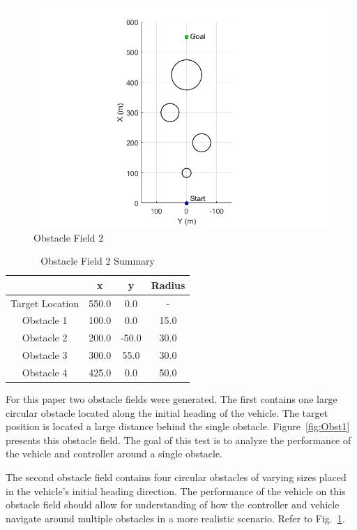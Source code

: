 \documentclass[12pt,twocolumn]{article}
\begin{document}
\begin{figure}
	\centering
	\includegraphics[width=\columnwidth]{Figs/ObstacleField2.png}
	\caption{\small Obstacle Field 2}   
	\label{fig:Obst2}
\end{figure}

\begin{table}
\begin{center}
	\begin{tabular}{||c|c|c|c||} 
		\hline
		& x & y & Radius\\
		\hline
		Target Location  & 550.0 & 0.0 & -\\ 
		\hline
		Obstacle 1 & 100.0 & 0.0 & 15.0\\
		\hline
		Obstacle 2 & 200.0 & -50.0 & 30.0\\
		\hline
		Obstacle 3 & 300.0 & 55.0 & 30.0\\
		\hline
		Obstacle 4 & 425.0 & 0.0 & 50.0\\
		\hline
	\end{tabular}
\end{center}
\caption{Obstacle Field 2 Summary}
\label{t:Obst2Summary}
\end{table}

For this paper two obstacle fields were generated. The first contains one large circular obstacle located along the initial heading of the vehicle. The target position is located a large distance behind the single obstacle. Figure~\ref{fig:Obst1} presents this obstacle field. The goal of this test is to analyze the performance of the vehicle and controller around a single obstacle. 

The second obstacle field contains four circular obstacles of varying sizes placed in the vehicle’s initial heading direction. The performance of the vehicle on this obstacle field should allow for understanding of how the controller and vehicle navigate around multiple obstacles in a more realistic scenario. Refer to Fig.~\ref{fig:Obst2}.
\end{document}

